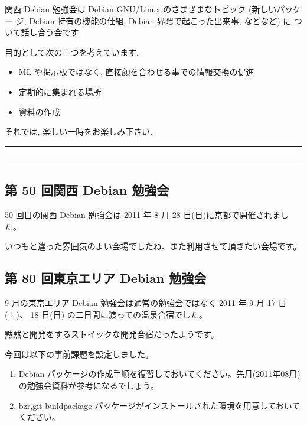 \documentclass[mingoth,a4paper]{jsarticle}
\begin{document}
関西 Debian 勉強会は Debian GNU/Linux のさまざまなトピック (新しいパッケー
ジ, Debian 特有の機能の仕組, Debian 界隈で起こった出来事, などなど) に
ついて話し合う会です.

目的として次の三つを考えています.
\begin{itemize}
      \item ML や掲示板ではなく, 直接顔を合わせる事での情報交換の促進
      \item 定期的に集まれる場所
      \item 資料の作成
\end{itemize}

それでは, 楽しい一時をお楽しみ下さい.

\clearpage

\begin{minipage}[b]{0.2\hsize}
 {}
\end{minipage}
\begin{minipage}[b]{0.8\hsize}
\hrule
\vspace{2mm}
\hrule
\setcounter{tocdepth}{1}
\tableofcontents
\vspace{2mm}
\hrule
\end{minipage}



\subsection{第 50 回関西 Debian 勉強会}
50 回目の関西 Debian 勉強会は 2011 年 8 月 28 日(日)に京都で開催されました。

いつもと違った雰囲気のよい会場でしたね、また利用させて頂きたい会場です。

\subsection{第 80 回東京エリア Debian 勉強会}
9 月の東京エリア Debian 勉強会は通常の勉強会ではなく 2011 年 9 月 17 日(土)、
18 日(日) の二日間に渡っての温泉合宿でした。

黙黙と開発をするストイックな開発合宿だったようです。

\clearpage

今回は以下の事前課題を設定しました。


\begin{enumerate}
\item Debian パッケージの作成手順を復習しておいてください。先月(2011年08月)の勉強会資料が参考になるでしょう。
\item {bzr,git}-buildpackage パッケージがインストールされた環境を用意しておいてください。
\end{enumerate}
\end{document}
